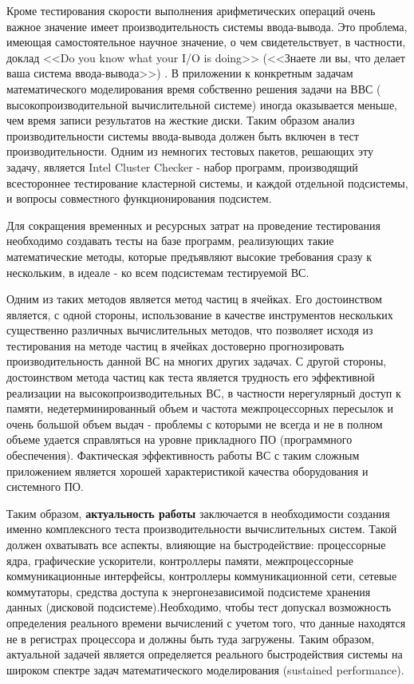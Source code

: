  Кроме тестирования скорости выполнения арифметических операций очень важное значение имеет производительность системы ввода-вывода. Это проблема, имеющая самостоятельное научное значение, о чем свидетельствует, в частности, доклад  <<Do you know what your I/O is doing>> (<<Знаете ли вы, что делает ваша система ввода-вывода>>) \cite{IOdoing}. В приложении к конкретным задачам математического моделирования время собственно решения задачи на ВВС ( высокопроизводительной вычислительной системе) иногда оказывается меньше, чем время записи результатов на жесткие диски.
 Таким образом анализ производительности системы ввода-вывода должен быть включен в тест производительности.
 Одним из немногих тестовых пакетов, решающих эту задачу, является Intel Cluster Checker - набор программ, производящий всестороннее тестирование кластерной системы, и каждой отдельной подсистемы, и вопросы совместного функционирования подсистем. 
 
 Для сокращения временных и ресурсных затрат на проведение тестирования необходимо создавать тесты на базе программ, реализующих такие математические методы, которые предъявляют высокие требования сразу к нескольким, в идеале - ко всем подсистемам тестируемой ВС. 
 
 Одним из таких методов является метод частиц в ячейках. Его достоинством является, с одной стороны, использование в качестве инструментов нескольких существенно различных вычислительных методов, что позволяет исходя из тестирования на методе частиц в ячейках достоверно прогнозировать производительность данной ВС на многих других задачах. С другой стороны, достоинством метода частиц как теста является трудность его эффективной реализации на высокопроизводительных ВС, в частности нерегулярный доступ к памяти, недетерминированный объем и частота межпроцессорных пересылок и очень большой объем выдач - проблемы с которыми не всегда и не в полном объеме удается справляться на уровне прикладного ПО (программного обеспечения). Фактическая эффективность работы ВС с таким сложным приложением является хорошей характеристикой качества оборудования и системного ПО.
 
 Таким образом,\textbf{ актуальность работы} заключается в необходимости создания именно комплексного теста производительности вычислительных систем. Такой должен охватывать все аспекты, влияющие на быстродействие: процессорные ядра, графические ускорители, контроллеры памяти, межпроцессорные коммуникационные интерфейсы, контроллеры коммуникационной сети, сетевые коммутаторы, средства доступа к энергонезависимой  подсистеме хранения данных (дисковой подсистеме).Необходимо, чтобы тест допускал возможность определения  реального времени вычислений с учетом того, что данные находятся не в регистрах процессора и должны быть туда загружены. Таким образом, актуальной задачей является определяется реального быстродействия системы на широком спектре задач математического моделирования (sustained performance). 


